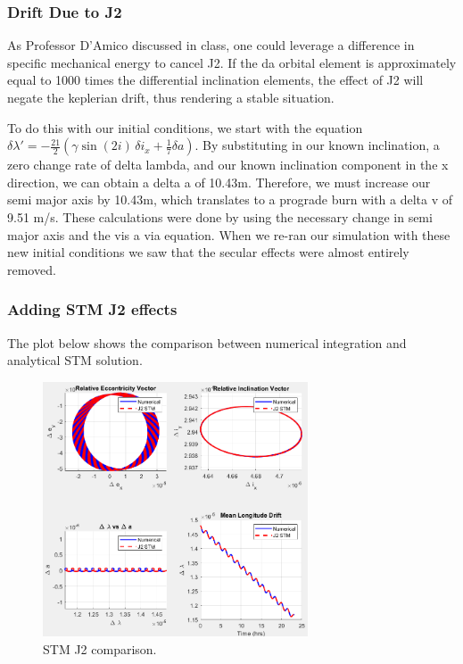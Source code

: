 \subsubsection{Drift Due to J2}
As Professor D'Amico discussed in class, one could leverage a difference in specific mechanical energy to cancel J2. If the da orbital element is approximately equal to 1000 times the differential inclination elements, the effect of J2 will negate the keplerian drift, thus rendering a stable situation. 

To do this with our initial conditions, we start with the equation $\delta \lambda' = -\frac{21}{2} \left( \gamma \sin(2i)\, \delta i_x + \frac{1}{7} \delta a \right)$. By substituting in our known inclination, a zero change rate of delta lambda, and our known inclination component in the x direction, we can obtain a delta a of 10.43m. Therefore, we must increase our semi major axis by 10.43m, which translates to a prograde burn with a delta v of 9.51 m/s. These calculations were done by using the necessary change in semi major axis and the vis a via equation. When we re-ran our simulation with these new initial conditions we saw that the secular effects were almost entirely removed.


\subsubsection{Adding STM J2 effects}

The plot below shows the comparison between numerical integration and analytical STM solution.

\begin{figure}[H]
    \centering
    \includegraphics[width=0.7\textwidth]{PS4/Figures/ROE_STM_Comparison.png}
    \caption{STM J2 comparison.}
    \label{fig:stm_comparison}
\end{figure}